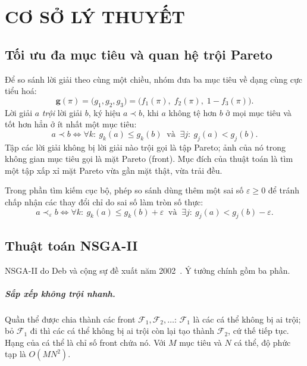 \chapter{CƠ SỞ LÝ THUYẾT}
\label{chap:coso}

\section{Tối ưu đa mục tiêu và quan hệ trội Pareto}

Để so sánh lời giải theo cùng một chiều, nhóm đưa ba mục tiêu về dạng cùng cực tiểu hoá:
\begin{equation}
  \mathbf{g}(\pi) = \big(g_1, g_2, g_3\big) = \big(f_1(\pi),\; f_2(\pi),\; 1 - f_3(\pi)\big).
\end{equation}
Lời giải $a$ \emph{trội} lời giải $b$, ký hiệu $a \prec b$, khi $a$ không tệ hơn $b$ ở mọi mục tiêu và
tốt hơn hẳn ở ít nhất một mục tiêu:
\begin{equation}
  a \prec b \iff \forall k:\ g_k(a) \le g_k(b) \;\;\text{và}\;\; \exists j:\ g_j(a) < g_j(b).
\end{equation}
Tập các lời giải không bị lời giải nào trội gọi là tập Pareto; ảnh của nó trong không gian mục tiêu
gọi là mặt Pareto (front). Mục đích của thuật toán là tìm một tập xấp xỉ mặt Pareto vừa gần mặt thật,
vừa trải đều.

Trong phần tìm kiếm cục bộ, phép so sánh dùng thêm một sai số $\varepsilon \ge 0$ để tránh chấp nhận
các thay đổi chỉ do sai số làm tròn số thực:
\begin{equation}
  a \prec_\varepsilon b \iff \forall k:\ g_k(a) \le g_k(b) + \varepsilon \;\;\text{và}\;\;
  \exists j:\ g_j(a) < g_j(b) - \varepsilon .
  \label{eq:dom-eps}
\end{equation}

\section{Thuật toán NSGA-II}

NSGA-II do Deb và cộng sự đề xuất năm 2002~\cite{deb2002}. Ý tưởng chính gồm ba phần.

\paragraph{Sắp xếp không trội nhanh.} Quần thể được chia thành các front $\mathcal{F}_1,
\mathcal{F}_2,\dots$: $\mathcal{F}_1$ là các cá thể không bị ai trội; bỏ $\mathcal{F}_1$ đi thì các cá
thể không bị ai trội còn lại tạo thành $\mathcal{F}_2$, cứ thế tiếp tục. Hạng của cá thể là chỉ số
front chứa nó. Với $M$ mục tiêu và $N$ cá thể, độ phức tạp là $O(MN^2)$.

